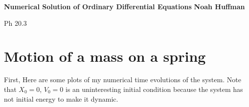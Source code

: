 \documentclass[a4paper, 11pt]{article}
\begin{document}
\large\textbf{Numerical Solution of Ordinary Differential Equations} \hfill \textbf{Noah Huffman}
\par \normalsize Ph 20.3

\section{Motion of a mass on a spring}

\par First, Here are some plots of my numerical time evolutions of the system. Note that $X_{0}=0$, $V_{0}=0$ is an uninteresting initial condition because the system has not initial energy to make it dynamic.

 \begin{figure}[H]
\\

\end{figure}
\end{document}
